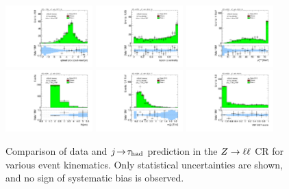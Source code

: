 \begin{figure}[tp]
  \includegraphics[width=0.30\textwidth]{figures/analysis/vbf-ZllCR/jets-etaprod}
  \includegraphics[width=0.30\textwidth]{figures/analysis/vbf-ZllCR/lep-eta-centrality}
  \includegraphics[width=0.30\textwidth]{figures/analysis/vbf-ZllCR/system-pt} \\
  \includegraphics[width=0.30\textwidth]{figures/analysis/vbf-ZllCR/n-jets30}
  \includegraphics[width=0.30\textwidth]{figures/analysis/vbf-ZllCR/dijet-m-veryhigh}
  \includegraphics[width=0.30\textwidth]{figures/analysis/vbf-ZllCR/BDTEve-VBF} \\
  \caption{Comparison of data and $j\!\rightarrow\!\tau_\text{had}$ prediction in the $Z \rightarrow \ell\ell$ CR for various event kinematics. Only statistical uncertainties are shown, and no sign of systematic bias is observed.}
  \label{fig:backgrounds-ZllCR-jets}
\end{figure}


